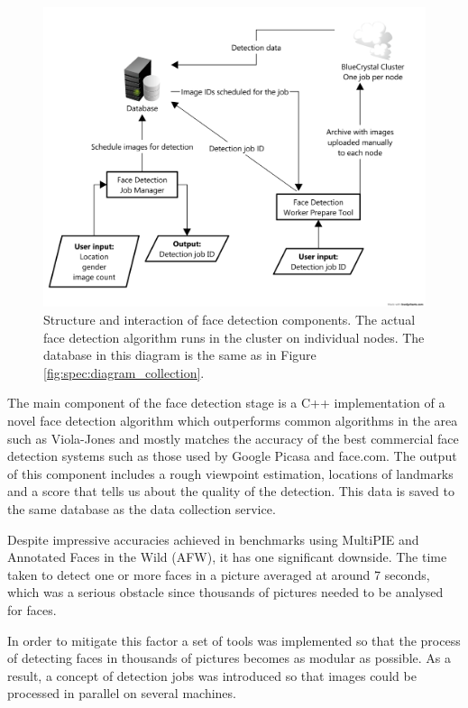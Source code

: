 \begin{figure}
\begin{center}
    \includegraphics[width=\textwidth]{figures/spec/diagram_detection}
\end{center}
\caption{Structure and interaction of face detection components. The actual
face detection algorithm runs in the cluster on individual nodes. The database
in this diagram is the same as in Figure \ref{fig:spec:diagram_collection}.}
\label{fig:spec:diagram_detection}
\end{figure}

The main component of the face detection stage is a C++ implementation of a
novel face detection algorithm which outperforms common algorithms in the area
such as Viola-Jones and mostly matches the accuracy of the best commercial face
detection systems such as those used by Google Picasa and face.com. The output
of this component includes a rough viewpoint estimation, locations of landmarks
and a score that tells us about the quality of the detection. This data is
saved to the same database as the data collection service.

Despite impressive accuracies achieved in benchmarks using MultiPIE and
Annotated Faces in the Wild (AFW), it has one significant downside. The time
taken to detect one or more faces in a picture averaged at around 7 seconds,
which was a serious obstacle since thousands of pictures needed to be analysed
for faces.

In order to mitigate this factor a set of tools was implemented so that the
process of detecting faces in thousands of pictures becomes as modular as
possible. As a result, a concept of detection jobs was introduced so that images
could be processed in parallel on several machines.

